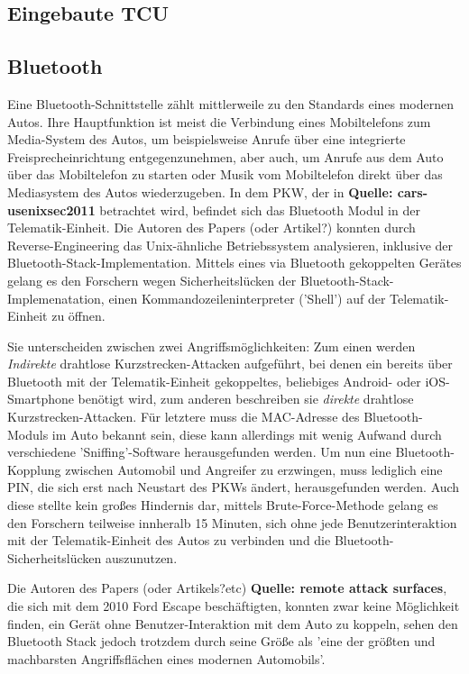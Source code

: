 \documentclass[
    fontsize=12pt,
    headings=small,
    parskip=half,           %
    bibliography=totoc,9
    numbers=noenddot,       %
    open=any,               %
    ]{scrreprt}
\begin{document}
\subsection{Eingebaute TCU}

\subsection{Bluetooth}
Eine Bluetooth-Schnittstelle zählt mittlerweile zu den Standards eines modernen Autos. Ihre Hauptfunktion ist meist die Verbindung eines Mobiltelefons zum Media-System des Autos, um beispielsweise Anrufe über eine integrierte Freisprecheinrichtung entgegenzunehmen, aber auch, um Anrufe aus dem Auto über das Mobiltelefon zu starten oder Musik vom Mobiltelefon direkt über das Mediasystem des Autos wiederzugeben.
In dem PKW, der in \textbf{Quelle: cars-usenixsec2011} betrachtet wird, befindet sich das Bluetooth Modul in der Telematik-Einheit. Die Autoren des Papers (oder Artikel?) konnten durch Reverse-Engineering das Unix-ähnliche Betriebssystem analysieren, inklusive der Bluetooth-Stack-Implementation. Mittels eines via Bluetooth gekoppelten Gerätes gelang es den Forschern wegen Sicherheitslücken der Bluetooth-Stack-Implemenatation, einen Kommandozeileninterpreter ('Shell') auf der Telematik-Einheit zu öffnen. \par
Sie unterscheiden zwischen zwei Angriffsmöglichkeiten: Zum einen werden \textit{Indirekte} drahtlose Kurzstrecken-Attacken aufgeführt, bei denen ein bereits über Bluetooth mit der Telematik-Einheit gekoppeltes, beliebiges Android- oder iOS-Smartphone benötigt wird, zum anderen beschreiben sie \textit{direkte} drahtlose Kurzstrecken-Attacken. Für letztere muss die MAC-Adresse des Bluetooth-Moduls im Auto bekannt sein, diese kann allerdings mit wenig Aufwand durch verschiedene 'Sniffing'-Software herausgefunden werden. Um nun eine Bluetooth-Kopplung zwischen Automobil und Angreifer zu erzwingen, muss lediglich eine PIN, die sich erst nach Neustart des PKWs ändert, herausgefunden werden. Auch diese stellte kein großes Hindernis dar, mittels Brute-Force-Methode gelang es den Forschern teilweise innheralb 15 Minuten, sich ohne jede Benutzerinteraktion mit der Telematik-Einheit des Autos zu verbinden und die Bluetooth-Sicherheitslücken auszunutzen.\par
Die Autoren des Papers (oder Artikels?etc) \textbf{Quelle: remote attack surfaces}, die sich mit dem 2010 Ford Escape beschäftigten, konnten zwar keine Möglichkeit finden, ein Gerät ohne Benutzer-Interaktion mit dem Auto zu koppeln, sehen den Bluetooth Stack jedoch trotzdem durch seine Größe als 'eine der größten und machbarsten Angriffsflächen eines modernen Automobils'.
\end{document}
